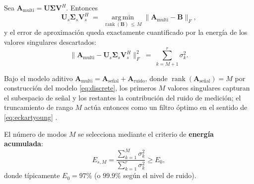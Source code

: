 Sea $\mathbf{A}_{\mathrm{multi}} = \mathbf{U}\boldsymbol{\Sigma}\mathbf{V}^H$.
Entonces
\begin{equation}
    \mathbf{U}_s\boldsymbol{\Sigma}_s\mathbf{V}_s^H
    \;=\;
    \operatorname*{arg\,min}_{\operatorname{rank}(\mathbf{B}) \,\le\, M}
    \bigl\lVert \mathbf{A}_{\mathrm{multi}} - \mathbf{B} \bigr\rVert_F,
    \label{eq:eckartyoung}
\end{equation}
y el error de aproximación queda exactamente cuantificado por la energía
de los valores singulares descartados:
\begin{equation}
    \bigl\lVert \mathbf{A}_{\mathrm{multi}}
    - \mathbf{U}_s\boldsymbol{\Sigma}_s\mathbf{V}_s^H \bigr\rVert_F^2
    \;=\; \sum_{k=M+1}^{r} \sigma_k^2 .
    \label{eq:trunc_error}
\end{equation}

Bajo el modelo aditivo
$\mathbf{A}_{\mathrm{multi}} = \mathbf{A}_{\mathrm{señal}} +
\mathbf{A}_{\mathrm{ruido}}$, donde
$\operatorname{rank}(\mathbf{A}_{\mathrm{señal}}) = M$ por construcción del
modelo \eqref{eq:discrete}, los primeros $M$ valores singulares capturan el
subespacio de señal y los restantes la contribución del ruido de medición;
el truncamiento de rango $M$ actúa entonces como un filtro óptimo en el
sentido de \eqref{eq:eckartyoung} \cite{brunton2022,tufts1982}.

El número de modos $M$ se selecciona mediante el criterio de \textbf{energía acumulada}:
\begin{equation}
E_{s,M} = \frac{\displaystyle\sum_{k=1}^{M} \sigma_k^2}{\displaystyle\sum_{k=1}^{r} \sigma_k^2} \ge E_0,
\label{eq:energy}
\end{equation}
donde típicamente $E_0 = 97\%$ (o $99.9\%$ según el nivel de ruido).


